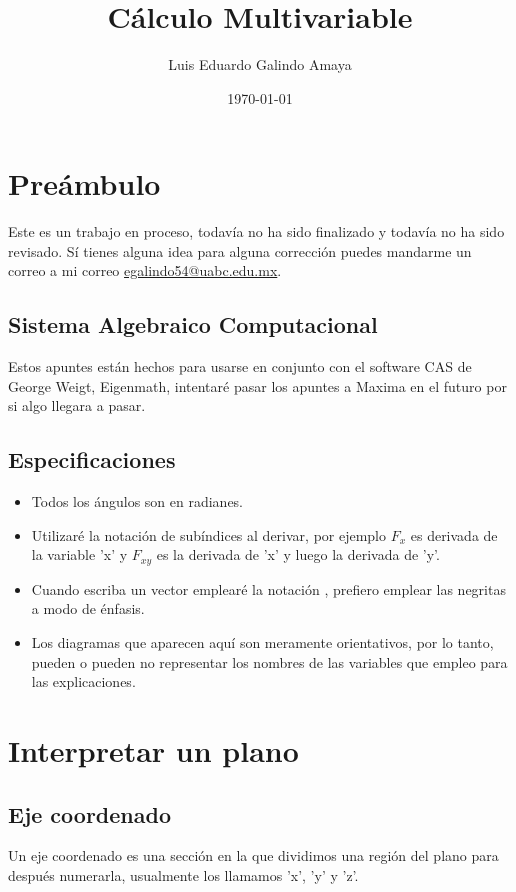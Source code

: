 \documentclass{article}
\author{Luis Eduardo Galindo Amaya}
\date{\today}
\title{Cálculo Multivariable}
\begin{document}
\maketitle
\tableofcontents


\section{Preámbulo}
\label{sec:org99ed7f6}
Este es un trabajo en proceso, todavía no ha sido finalizado y todavía no ha sido revisado. Sí tienes alguna idea para alguna corrección puedes mandarme un correo a mi correo \href{mailto:egalindo54@uabc.edu.mx}{egalindo54@uabc.edu.mx}.

\subsection{Sistema Algebraico Computacional}
\label{sec:org9de3d1b}
Estos apuntes están hechos para usarse en conjunto con el software CAS de George Weigt, Eigenmath, intentaré pasar los apuntes a Maxima en el futuro por si algo llegara a pasar.

\subsection{Especificaciones}
\label{sec:org6798358}
\begin{itemize}
\item Todos los ángulos son en radianes.
\item Utilizaré la notación de subíndices al derivar, por ejemplo \(F_x\) es derivada de la variable 'x' y \(F_{xy}\) es la derivada de 'x' y luego la derivada de 'y'.
\item Cuando escriba un vector emplearé la notación , prefiero emplear las negritas a modo de énfasis.
\item Los diagramas que aparecen aquí son meramente orientativos, por lo tanto, pueden o pueden no representar los nombres de las variables que empleo para las explicaciones.
\end{itemize}

\section{Interpretar un plano}
\label{sec:org4dc51ac}
\subsection{Eje coordenado}
\label{sec:org0efaec1}
Un eje coordenado es una sección en la que dividimos una región del plano para después numerarla, usualmente los llamamos 'x', 'y' y 'z'.
\end{document}
